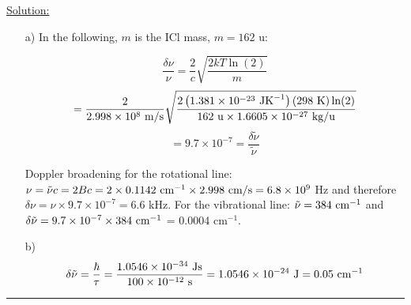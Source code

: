 \noindent
\underline{Solution:}\\

\noindent

\begin{itemize}

\item[a)] In the following, $m$ is the ICl mass, $m = 162$ u:

$$\frac{\delta\nu}{\nu} = \frac{2}{c}\sqrt{\frac{2kT\ln(2)}{m}}$$
$$ = \frac{2}{2.998\times 10^8\textnormal{ m/s}}\sqrt{\frac{2\left(1.381\times 10^{-23}\textnormal{ JK}^{-1}\right)\left(298\textnormal{ K}\right)\ln(2)}{162\textnormal{ u}\times 1.6605\times 10^{-27}\textnormal{ kg/u}}}$$
$$ = 9.7\times 10^{-7} = \frac{\delta\tilde{\nu}}{\tilde{\nu}}$$

Doppler broadening for the rotational line: $\nu = \tilde{\nu}c = 2Bc = 2\times 0.1142\textnormal{ cm}^{-1} \times 2.998\textnormal{ cm/s} = 6.8\times 10^9$ Hz and therefore $\delta\nu = \nu\times 9.7\times 10^{-7} = 6.6$ kHz. For the vibrational line: $\tilde{\nu} = 384\textnormal{ cm}^{-1}$ and $\delta\tilde{\nu} = 9.7\times 10^{-7}\times 384\textnormal{ cm}^{-1}$ = 0.0004 cm$^{-1}$.

\item[b)] $$\delta\tilde{\nu} = \frac{\hbar}{\tau} = \frac{1.0546\times 10^{-34}\textnormal{ Js}}{100\times 10^{-12}\textnormal{ s}} = 1.0546\times 10^{-24}\textnormal{ J} = 0.05\textnormal{ cm}^{-1}$$
\end{itemize}

\hrule\vspace{0.5cm}




